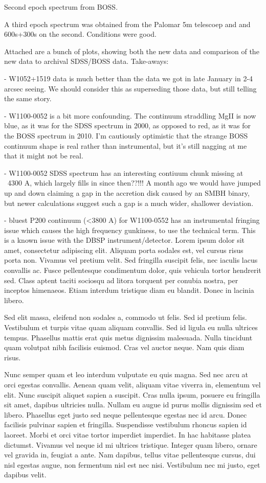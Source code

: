 \documentclass{emulateapj}
\begin{document}
Second epoch spectrum from BOSS. 

A third epoch spectrum was obtained from the Palomar 5m 
telescoep and 
 and 600s+300s on the second.  Conditions were good.

Attached are a bunch of plots, showing both the new data and
comparison of the new data to archival SDSS/BOSS data.  Take-aways:

- W1052+1519 data is much better than the data we got in late January
in 2-4 arcsec seeing.  We should consider this as superseding those
data, but still telling the same story.

- W1100-0052 is a bit more confounding.  The continuum straddling MgII
is now blue, as it was for the SDSS spectrum in 2000, as opposed to
red, as it was for the BOSS spectrum in 2010.  I'm cautiously
optimistic that the strange BOSS continuum shape is real rather than
instrumental, but it's still nagging at me that it might not be real.

- W1100-0052 SDSS spectrum has an interesting contiuum chunk missing
at ~4300 A, which largely fills in since then??!!!   A month ago we
would have jumped up and down claiming a gap in the accretion disk
caused by an SMBH binary, but newer calculations suggest such a gap is
a much wider, shallower deviation.

- bluest P200 continuum (<3800 A) for W1100-0552 has an instrumental
fringing issue which causes the high frequency gunkiness, to use the
technical term.  This is a known issue with the DBSP
instrument/detector.
Lorem ipsum dolor sit amet, consectetur adipiscing elit. Aliquam porta
sodales est, vel cursus risus porta non. Vivamus vel pretium
velit. Sed fringilla suscipit felis, nec iaculis lacus convallis
ac. Fusce pellentesque condimentum dolor, quis vehicula tortor
hendrerit sed. Class aptent taciti sociosqu ad litora torquent per
conubia nostra, per inceptos himenaeos. Etiam interdum tristique diam
eu blandit. Donec in lacinia libero.

Sed elit massa, eleifend non sodales a, commodo ut felis. Sed id
pretium felis. Vestibulum et turpis vitae quam aliquam convallis. Sed
id ligula eu nulla ultrices tempus. Phasellus mattis erat quis metus
dignissim malesuada. Nulla tincidunt quam volutpat nibh facilisis
euismod. Cras vel auctor neque. Nam quis diam risus.

Nunc semper quam et leo interdum vulputate eu quis magna. Sed nec arcu
at orci egestas convallis. Aenean quam velit, aliquam vitae viverra
in, elementum vel elit. Nunc suscipit aliquet sapien a suscipit. Cras
nulla ipsum, posuere eu fringilla sit amet, dapibus ultricies
nulla. Nullam eu augue id purus mollis dignissim sed et
libero. Phasellus eget justo sed neque pellentesque egestas nec id
arcu. Donec facilisis pulvinar sapien et fringilla. Suspendisse
vestibulum rhoncus sapien id laoreet. Morbi et orci vitae tortor
imperdiet imperdiet. In hac habitasse platea dictumst. Vivamus vel
neque id mi ultrices tristique. Integer quam libero, ornare vel
gravida in, feugiat a ante. Nam dapibus, tellus vitae pellentesque
cursus, dui nisl egestas augue, non fermentum nisl est nec
nisi. Vestibulum nec mi justo, eget dapibus velit.
\end{document}
